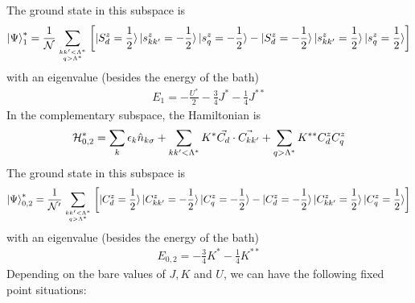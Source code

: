 \documentclass[12pt,twoside]{report}
\numberwithin{equation}{section}
\begin{document}
The ground state in this subspace is
\begin{equation}\begin{aligned}
	\ket{\Psi}^*_{1}= \frac{1}{\mathcal{N}}\sum_{kk^\prime < \Lambda^*\atop{q>\Lambda^*}}\left[\ket{S_d^z= \frac{1}{2}}\ket{s^z_{kk^\prime}= - \frac{1}{2}}\ket{s^z_{q}= - \frac{1}{2}} - \ket{S_d^z=- \frac{1}{2}}\ket{s^z_{kk^\prime}=  \frac{1}{2}}\ket{s^z_{q}=  \frac{1}{2}}\right]
\end{aligned}\end{equation}
with an eigenvalue (besides the energy of the bath)
\begin{equation}\begin{aligned}
	E_{1} = - \frac{U^*}{2} - \frac{3}{4}J^* - \frac{1}{4}J^{**}
\end{aligned}\end{equation}
In the complementary subspace, the Hamiltonian is
\begin{equation}\begin{aligned}
	\mathcal{H}^*_{0,2} = \sum_k \epsilon_k \hat n_{k\sigma} + \sum_{kk^\prime < \Lambda^*}K^* \vec{C_d}\cdot\vec{C_{kk^\prime}}+ \sum_{q > \Lambda^*}K^{**} C_d^z C^z_{q}
\end{aligned}\end{equation}
The ground state in this subspace is
\begin{equation}\begin{aligned}
	\ket{\Psi}^*_{0,2}= \frac{1}{\mathcal{N^\prime}}\sum_{kk^\prime < \Lambda^*\atop{q>\Lambda^*}}\left[\ket{C_d^z= \frac{1}{2}}\ket{C^z_{kk^\prime}= - \frac{1}{2}}\ket{C^z_{q}= - \frac{1}{2}} - \ket{C_d^z=- \frac{1}{2}}\ket{C^z_{kk^\prime}=  \frac{1}{2}}\ket{C^z_{q}=  \frac{1}{2}}\right]
\end{aligned}\end{equation}
with an eigenvalue (besides the energy of the bath)
\begin{equation}\begin{aligned}
	E_{0,2} = - \frac{3}{4}K^* - \frac{1}{4}K^{**}
\end{aligned}\end{equation}
Depending on the bare values of \(J,K\) and \(U\), we can have the following fixed point situations:
\end{document}
